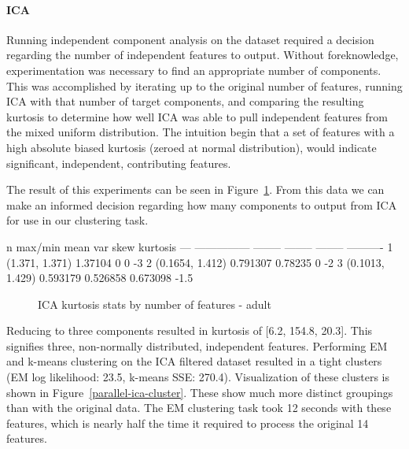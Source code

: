 \documentclass{sig-alternate}
\begin{document}
\paragraph{ICA}

Running independent component analysis on the dataset required a decision regarding the number of independent features to output. Without foreknowledge, experimentation was necessary to find an appropriate number of components. This was accomplished by iterating up to the original number of features, running ICA with that number of target components, and comparing the resulting kurtosis to determine how well ICA was able to pull independent features from the mixed uniform distribution. The intuition begin that a set of features with a high absolute biased kurtosis (zeroed at normal distribution), would indicate significant, independent, contributing features.

The result of this experiments can be seen in Figure~\ref{ica-stats-adult}. From this data we can make an informed decision regarding how many components to output from ICA for use in our clustering task. 

\tiny
\begin{verbbox}
  n  max/min              mean       var      skew    kurtosis
---  ---------------  --------  --------  --------  ----------
  1  (1.371, 1.371)   1.37104   0         0               -3
  2  (0.1654, 1.412)  0.791307  0.78235   0               -2
  3  (0.1013, 1.429)  0.593179  0.526858  0.673098        -1.5
\end{verbbox}
\normalsize

\begin{figure}[!htbp]
    \centering
    \theverbbox
    \caption{ICA kurtosis stats by number of features - adult\label{ica-stats-adult}}
\end{figure}

Reducing to three components resulted in kurtosis of [6.2, 154.8, 20.3]. This signifies three, non-normally distributed, independent features. Performing EM and k-means clustering on the ICA filtered dataset resulted in a tight clusters (EM log likelihood: 23.5, k-means SSE: 270.4). Visualization of these clusters is shown in Figure~\ref{parallel-ica-cluster}. These show much more distinct groupings than with the original data. The EM clustering task took 12 seconds with these features, which is nearly half the time it required to process the original 14 features.
\end{document}
